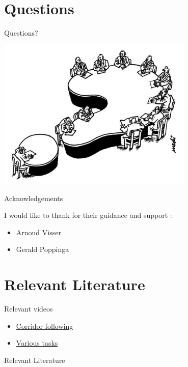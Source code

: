 \documentclass{beamer}
\begin{document}
\section{Questions}
\begin{frame}{Questions?}
\begin{center}
\includegraphics[width = 0.7\textwidth]{images/questions.jpg}
\end{center}
\end{frame}

\begin{frame}{Acknowledgements}
\begin{block}{I would like to thank for their guidance and support
:}
\begin{itemize}
\item Arnoud Visser
\item Gerald Poppinga
\end{itemize}
\end{block}
\end{frame}

\section{Relevant Literature}
\begin{frame}{}
\begin{block}{Relevant videos}
\begin{itemize}
\item \href{http://youtu.be/7XyddRwP_KA}{Corridor following}
\item \href{http://youtu.be/MF0nHhMKl5g}{Various tasks}
\end{itemize}

\end{block}
\end{frame}


\begin{frame}[allowframebreaks]{Relevant Literature}
\footnotesize


\end{frame}
\end{document}
